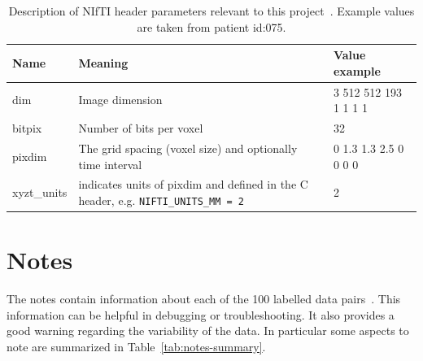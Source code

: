 \documentclass[12pt,twoside]{report}
\begin{document}
\begin{table}[ht]
  \centering
  \begin{tabular}{>{\raggedright}p{1.5cm}p{8cm}p{4cm}}
    \toprule
    \textbf{Name} & \textbf{Meaning}                                                                          & \textbf{Value example} \\
    \midrule
    dim           & Image dimension                                                                           & 3 512 512 193 1 1 1 1  \\
    bitpix        & Number of bits per voxel                                                                  & 32                     \\
    pixdim        & The grid spacing (voxel size) and optionally time interval                                & 0 1.3 1.3 2.5 0 0 0 0  \\
    xyzt\_units   & indicates units of pixdim and defined in the C header, e.g. \texttt{NIFTI\_UNITS\_MM = 2} & 2                      \\
    \bottomrule
  \end{tabular}
  \caption{Description of NIfTI header parameters relevant to this project~\cite{dicom-to-nifti-conversion, nifti-headers, nifti-data-format}. Example values are taken from patient id:075.}
 \label{tab:nifti-header}
\end{table}

\section{Notes}\label{sec:data-notes}

The notes contain information about each of the 100 labelled data pairs~\cite{AMLART-data}. This information can be helpful in debugging or troubleshooting. It also provides a good warning regarding the variability of the data. In particular some aspects to note are summarized in Table~\ref{tab:notes-summary}.
\end{document}
